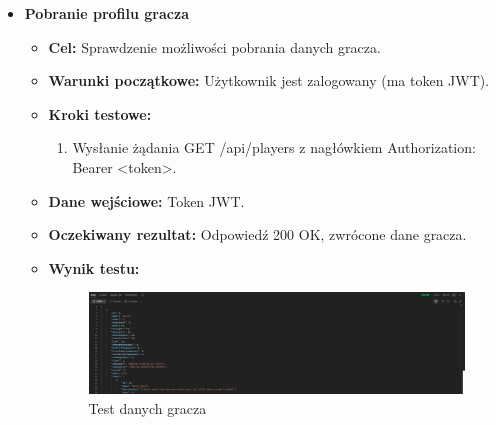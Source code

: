 \begin{itemize}
    \item \textbf{Pobranie profilu gracza}
    \begin{itemize}
        \item \textbf{Cel:} Sprawdzenie możliwości pobrania danych gracza.
        \item \textbf{Warunki początkowe:} Użytkownik jest zalogowany (ma token JWT).
        \item \textbf{Kroki testowe:}
        \begin{enumerate}
            \item Wysłanie żądania GET /api/players z nagłówkiem Authorization: Bearer <token>.
        \end{enumerate}
        \item \textbf{Dane wejściowe:} Token JWT.
        \item \textbf{Oczekiwany rezultat:} Odpowiedź 200 OK, zwrócone dane gracza.
        \item \textbf{Wynik testu:}
        \begin{figure}[H]
            \includegraphics[width=480px]{figures/testy/test-playerdata.png}
            \caption{Test danych gracza}
        \end{figure}
    \end{itemize}


\end{itemize}
